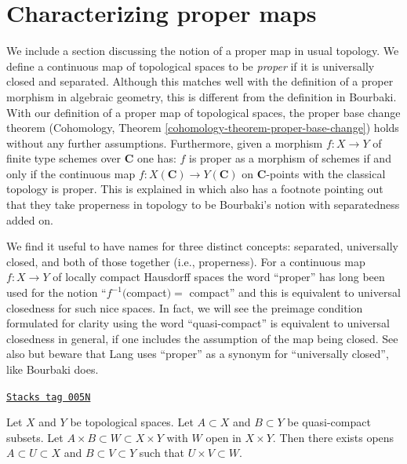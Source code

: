 \section{Characterizing proper maps}
\label{topology-section-proper}
We include a section discussing the notion of a proper map in usual
topology. We define a continuous map of topological spaces to be
{\it proper} if it is universally closed and separated.
Although this matches well with the definition of a proper morphism
in algebraic geometry, this is different from the definition in Bourbaki.
With our definition of a proper map of topological spaces, the
proper base change theorem (Cohomology, Theorem
\ref{cohomology-theorem-proper-base-change})
holds without any further assumptions. Furthermore, given a morphism
$f : X \to Y$ of finite type schemes over $\mathbf{C}$ one
has: $f$ is proper as a morphism of schemes if and only if
the continuous map $f : X(\mathbf{C}) \to Y(\mathbf{C})$
on $\mathbf{C}$-points with the classical topology is proper.
This is explained in \cite[Exp. XII, Prop.\ 3.2(v)]{SGA1}
which also has a footnote pointing out that they take properness
in topology to be Bourbaki's notion with separatedness added on.

\medskip\noindent
We find it useful to have names for three distinct concepts:
separated, universally closed, and both of those together (i.e., properness).
For a continuous map $f : X \to Y$ of locally compact Hausdorff spaces
the word ``proper'' has long been used for the notion
``$f^{-1}($compact$) =$ compact'' and
this is equivalent to universal closedness for such nice spaces.
In fact, we will see the preimage condition formulated for clarity
using the word ``quasi-compact'' is equivalent to universal closedness
in general, if one includes the assumption of the map being closed. See
also \cite[Exercises 22-26 in Chapter II]{LangReal} but
beware that Lang uses ``proper'' as a synonym for ``universally closed'',
like Bourbaki does.

\begin{lemma}

\label{topology-lemma-tube}
\href{https://stacks.math.columbia.edu/tag/005N}{\texttt{Stacks tag 005N}}

Let $X$ and $Y$ be topological spaces.
Let $A \subset X$ and $B \subset Y$ be quasi-compact subsets.
Let $A \times B \subset W \subset X \times Y$ with $W$
open in $X \times Y$. Then there exists opens $A \subset U \subset X$
and $B \subset V \subset Y$ such that $U \times V \subset W$.
\end{lemma}

